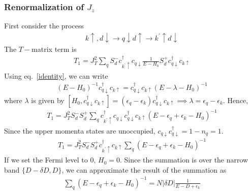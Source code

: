 \documentclass[twoside,11pt]{report}
\numberwithin{equation}{section}
\begin{document}
\subsubsection{Renormalization of \(J_z\)}
First consider the process
\begin{equation}\begin{aligned}
k \uparrow, d\downarrow \rightarrow q \downarrow d \uparrow \rightarrow k^\prime \uparrow d\downarrow
\end{aligned}\end{equation}
The \(T-\)matrix term is
\begin{equation}\begin{aligned}
T_1 = J_T^2\sum_q S_d^- c^\dagger_{k^\prime \uparrow}c_{q\downarrow}\frac{1}{E - H_0}S_d^+ c^\dagger_{q \downarrow}c_{k\uparrow}
\end{aligned}\end{equation}
Using eq.~\ref{identity}, we can write
\begin{equation}\begin{aligned}
(E - H_0)^{-1} c^\dagger_{q \downarrow}c_{k\uparrow} = c^\dagger_{q \downarrow}c_{k\uparrow}(E - \lambda -H_0)^{-1}
\end{aligned}\end{equation}
where \(\lambda\) is given by \(\left[H_0,c^\dagger_{q \downarrow}c_{k\uparrow}\right] = (\epsilon_q - \epsilon_k) c^\dagger_{q \downarrow}c_{k\uparrow} \implies \lambda = \epsilon_q - \epsilon_k\).
Hence,
\begin{equation}\begin{aligned}
	T_1 = J_T^2 S_d^- S_d^+ \sum_q c^\dagger_{k^\prime \uparrow}c_{q\downarrow}c^\dagger_{q \downarrow}c_{k\uparrow}\left(E - \epsilon_q + \epsilon_k - H_0\right)^{-1}
\end{aligned}\end{equation}
Since the upper momenta states are unoccupied, \(c_{q\downarrow}c^\dagger_{q \downarrow} = 1 -n_q = 1\).
\begin{equation}\begin{aligned}
	T_1 = J_T^2 S_d^- S_d^+ c^\dagger_{k^\prime \uparrow}c_{k\uparrow}\sum_q \left(E - \epsilon_q + \epsilon_k - H_0\right)^{-1}
\end{aligned}\end{equation}
If we set the Fermi level to 0, \(H_0 = 0\).
Since the summation is over the narrow band \(\{D - \delta D, D\}\), we can approximate the result of the summation as 
\begin{equation}\begin{aligned}
	\sum_q \left(E - \epsilon_q + \epsilon_k - H_0\right)^{-1} = N |\delta D | \frac{1}{E - D + \epsilon_k}
\end{aligned}\end{equation}
\end{document}
